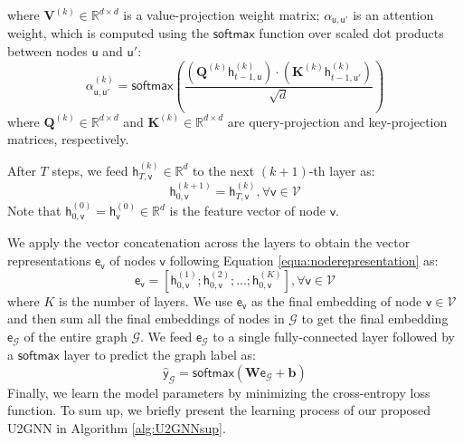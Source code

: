 \documentclass[twoside,leqno,twocolumn]{article}
\begin{document}
where $\boldsymbol{V}^{(k)} \in \mathbb{R}^{d\times d}$ is a value-projection weight matrix;  $\alpha_{\mathsf{u},\mathsf{u}'}$ is an attention weight, which is computed using the $\mathsf{softmax}$ function over scaled dot products between nodes $\mathsf{u}$ and $\mathsf{u}'$:
\begin{equation}
\alpha^{(k)}_{\mathsf{u},\mathsf{u}'} = \mathsf{softmax}\left(\frac{\left(\boldsymbol{Q}^{(k)}\boldsymbol{\mathsf{h}}^{(k)}_{t-1,\mathsf{u}}\right)\cdot\left(\boldsymbol{K}^{(k)}\boldsymbol{\mathsf{h}}^{(k)}_{t-1,\mathsf{u}'}\right)}{\sqrt{d}}\right) 
\end{equation}
where $\boldsymbol{Q}^{(k)} \in \mathbb{R}^{d\times d}$ and $\boldsymbol{K}^{(k)} \in \mathbb{R}^{d\times d}$ are query-projection and key-projection matrices, respectively.


After $T$ steps, we feed $\boldsymbol{\mathsf{h}}^{(k)}_{T,\mathsf{v}} \in \mathbb{R}^d$ to the next $(k+1)$-th layer as:
\begin{equation}
\boldsymbol{\mathsf{h}}^{(k+1)}_{0,\mathsf{v}} = \boldsymbol{\mathsf{h}}^{(k)}_{T,\mathsf{v}} , \forall \mathsf{v} \in \mathcal{V}
\label{equa:nextlayerequa}
\end{equation}
Note that $\boldsymbol{\mathsf{h}}^{(0)}_{0,\mathsf{v}} = \boldsymbol{\mathsf{h}}_{\mathsf{v}}^{(0)} \in \mathbb{R}^d$ is the feature vector of node $\mathsf{v}$.



We apply the vector concatenation across the layers to obtain the vector representations $\boldsymbol{\mathsf{e}}_\mathsf{v}$ of nodes $\mathsf{v}$ following Equation \ref{equa:noderepresentation} as:
\begin{equation}
\boldsymbol{\mathsf{e}}_\mathsf{v} = \left[\boldsymbol{\mathsf{h}}^{(1)}_{0,\mathsf{v}}; \boldsymbol{\mathsf{h}}^{(2)}_{0,\mathsf{v}}; ...; \boldsymbol{\mathsf{h}}^{(K)}_{0,\mathsf{v}}\right] , \forall \mathsf{v} \in \mathcal{V}
\label{equa:vectorev}
\end{equation}
where $K$ is the number of layers.
We use $\boldsymbol{\mathsf{e}}_{\mathsf{v}}$ as the final embedding of node $\mathsf{v}\in\mathcal{V}$ and then sum all the final embeddings of nodes in $\mathcal{G}$ to get the final embedding $\boldsymbol{\mathsf{e}}_{\mathcal{G}}$ of the entire graph $\mathcal{G}$.
We feed $\boldsymbol{\mathsf{e}}_{\mathcal{G}}$ to a single fully-connected layer followed by a $\mathsf{softmax}$ layer to predict the graph label as:
\begin{equation}
\boldsymbol{\mathsf{\hat{y}}}_{\mathcal{G}} = \mathsf{softmax}\left(\textbf{W}\boldsymbol{\mathsf{e}}_{\mathcal{G}} + \textbf{b}\right)
\label{equa:supervisedU2GNNloss}
\end{equation}
Finally, we learn the model parameters by minimizing the cross-entropy loss function. To sum up, we briefly present the learning process of our proposed U2GNN in Algorithm \ref{alg:U2GNNsup}. 
\end{document}
